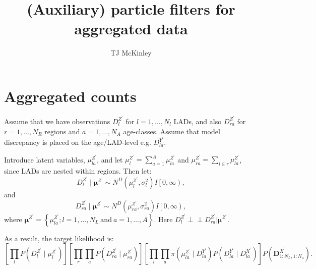 \documentclass[a4paper]{article}
\title{(Auxiliary) particle filters for aggregated data}
\author{TJ McKinley}
\date{}
\newcommand{\bD}{\bm{D}}
\newcommand{\bmu}{\bm{\mu}}
\newcommand{\indep}{\perp \!\!\! \perp}
\begin{document}
\maketitle

\section{Aggregated counts}

Assume that we have observations $D^{Z^\prime}_{l}$ for $l = 1, \dots, N_l$ LADs, and also $D^{Z^\prime}_{ra}$ for $r = 1, \dots, N_R$ regions and $a = 1, \dots, N_A$ age-classes. Assume that model discrepancy is placed on the age/LAD-level e.g. $D^{Y^\prime}_{la}$.

Introduce latent variables, $\mu^{Z^\prime}_{la}$, and let $\mu^{Z^\prime}_l = \sum_{a = 1}^A \mu^{Z^\prime}_{la}$ and $\mu^{Z^\prime}_{ra} = \sum_{l \in r} \mu^{Z^\prime}_{la}$, since LADs are nested within regions. Then let:
\begin{equation*}
    D^{Z^\prime}_l \mid \bmu^{Z^\prime} \sim N^D\left(\mu^{Z^\prime}_l, \sigma^2_l\right)I\left[0, \infty\right),
\end{equation*}
and
\begin{equation*}
    D^{Z^\prime}_{ra} \mid \bmu^{Z^\prime} \sim N^D\left(\mu^{Z^\prime}_{ra}, \sigma^2_{ra}\right)I\left[0, \infty\right),
\end{equation*}
where $\bmu^{Z^\prime} = \left\{\mu^{Z^\prime}_{la}; l = 1, \dots, N_L~\mbox{and}~a = 1, \dots, A\right\}$. Here $D^{Z^\prime}_l \indep D^{Z^\prime}_{ra} | \bmu^{Z^\prime}$. 

As a result, the target likelihood is:
\begin{equation}
    \left[\prod_{l} P\left(D^{Z^\prime}_l \mid \mu^{Z^\prime}_l\right)\right]\left[\prod_{r}\prod_{a} P\left(D^{Z^\prime}_{ra} \mid \mu^{Z^\prime}_{ra}\right)\right]\left[\prod_{l}\prod_a \pi\left(\mu^{Z^\prime}_{la} \mid D^{Y^\prime}_{la}\right)P\left(D^{Y^\prime}_{la} \mid D^{X^\prime}_{la}\right)\right]P\left(\bD^{X^\prime}_{1:N_L,1:N_a}\right).
\end{equation}
\end{document}
